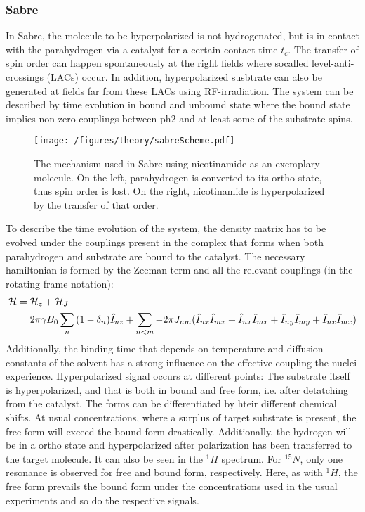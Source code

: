         \subsubsection{Sabre}
        \label{HPSabre}
        In Sabre, the molecule to be hyperpolarized is not hydrogenated, but is in contact with the parahydrogen via a catalyst for a certain contact time $t_c$. The transfer of spin order can happen spontaneously at the right fields where socalled level-anti-crossings (LACs) occur. In addition, hyperpolarized susbtrate can also be generated at fields far from these LACs using RF-irradiation. The system can be described by time evolution in bound and unbound state where the bound state implies non zero couplings between ph2 and at least some of the substrate spins.
        \begin{figure}
            \centering
            \texttt{[image: /figures/theory/sabreScheme.pdf]}
            \caption[Sabre scheme]{The mechanism used in Sabre using nicotinamide as an exemplary molecule. On the left, parahydrogen is converted to its ortho state, thus spin order is lost. On the right, nicotinamide is hyperpolarized by the transfer of that order.}
        \end{figure}
    To describe the time evolution of the system, the density matrix has to be evolved under the couplings present in the complex that forms when both parahydrogen and substrate are bound to the catalyst. The necessary hamiltonian is formed by the Zeeman term and all the relevant couplings (in the rotating frame notation):
    \begin{equation}
        \begin{aligned}
            \mathcal{H}& = \mathcal{H}_z + \mathcal{H}_J \\
                   & =\-2\pi\gamma B_0 \sum_n{(1-\delta_n)\hat{I}_{nz}} + \sum_{n<m} -2\pi J_{nm}(\hat{I}_{nx}\hat{I}_{mx} + \hat{I}_{nx}\hat{I}_{mx}+ \hat{I}_{ny}\hat{I}_{my} + \hat{I}_{nx}\hat{I}_{mx})
        \end{aligned}
    \end{equation}
    Additionally, the binding time that depends on temperature and diffusion constants of the solvent has a strong influence on the effective coupling the nuclei experience.
        Hyperpolarized signal occurs at different points: The substrate itself is hyperpolarized, and that is both in bound and free form, i.e. after detatching from the catalyst. The forms can be differentiated by hteir different chemical shifts. At usual concentrations, where a surplus of target substrate is present, the free form will exceed the bound form drastically. Additionally, the hydrogen will be in a ortho state and hyperpolarized after polarization has been transferred to the target molecule. It can also be seen in the $^1H$ spectrum.
        For $^{15}N$, only one resonance is observed for free and bound form, respectively. Here, as with $^1H$, the free form prevails the bound form under the concentrations used in the usual experiments and so do the respective signals.
